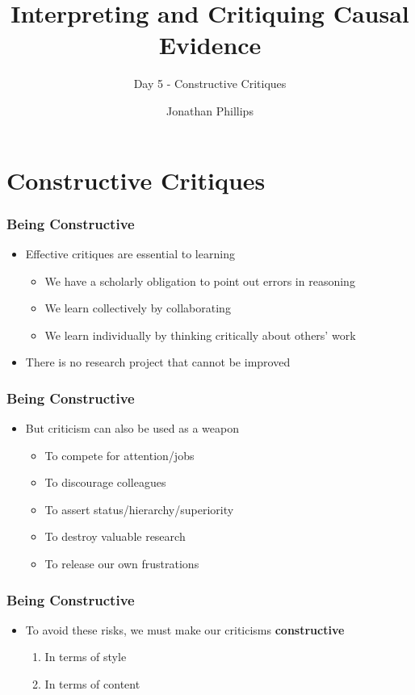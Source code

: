 \documentclass[xcolor=x11names,compress]{beamer}\usepackage[]{graphicx}\usepackage[]{xcolor}
\title{Interpreting and Critiquing Causal Evidence}
\subtitle{Day 5 - Constructive Critiques}
\author{Jonathan Phillips}
\renewcommand{\(}{\begin{columns}}
\renewcommand{\)}{\end{columns}}
\newcommand{\<}[1]{\begin{column}{#1}}
\renewcommand{\>}{\end{column}}
\begin{document}
\frame{\titlepage}

\section{Constructive Critiques}

\begin{frame}
\frametitle{Being Constructive}
\begin{itemize}
\item Effective critiques are essential to learning
\pause
\begin{itemize}
\item We have a scholarly obligation to point out errors in reasoning
\pause
\item We learn collectively by collaborating
\pause
\item We learn individually by thinking critically about others' work
\pause
\end{itemize}
\item There is no research project that cannot be improved
\end{itemize}
\end{frame}

\begin{frame}
\frametitle{Being Constructive}
\begin{itemize}
\item But criticism can also be used as a weapon
\pause
\begin{itemize}
\item To compete for attention/jobs
\pause
\item To discourage colleagues
\pause
\item To assert status/hierarchy/superiority
\pause
\item To destroy valuable research
\pause
\item To release our own frustrations
\end{itemize}
\end{itemize}
\end{frame}

\begin{frame}
\frametitle{Being Constructive}
\begin{itemize}
\item To avoid these risks, we must make our criticisms \textbf{constructive}
\pause
\begin{enumerate}
\item In terms of style
\pause
\item In terms of content
\end{enumerate}
\end{itemize}
\end{frame}
\end{document}
